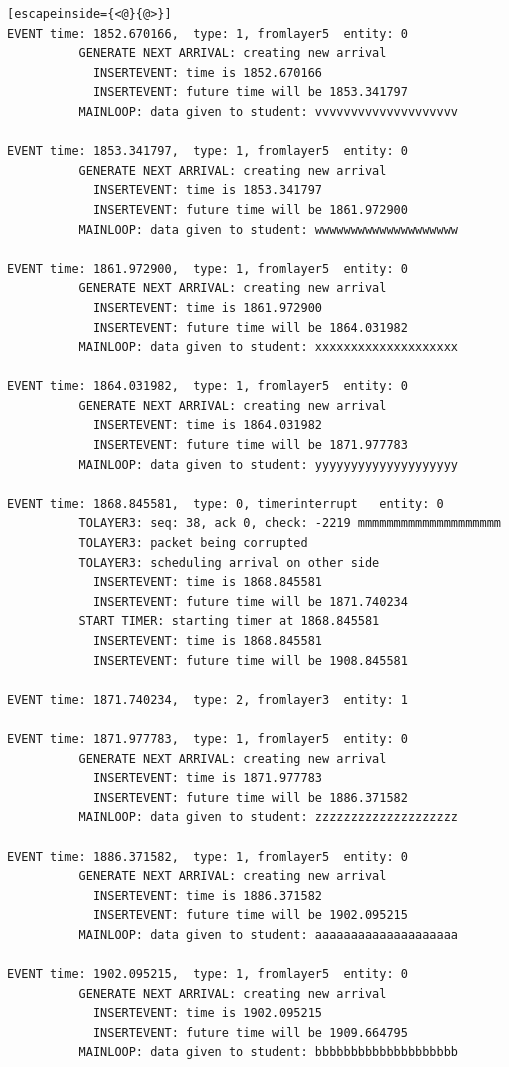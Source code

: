 \documentclass[paper=a4, fontsize=11pt]{scrartcl}
\numberwithin{equation}{section}		%
\numberwithin{figure}{section}			%
\numberwithin{table}{section}				%
\begin{document}
\begin{lstlisting}[escapeinside={<@}{@>}]
EVENT time: 1852.670166,  type: 1, fromlayer5  entity: 0
          GENERATE NEXT ARRIVAL: creating new arrival
            INSERTEVENT: time is 1852.670166
            INSERTEVENT: future time will be 1853.341797
          MAINLOOP: data given to student: vvvvvvvvvvvvvvvvvvvv

EVENT time: 1853.341797,  type: 1, fromlayer5  entity: 0
          GENERATE NEXT ARRIVAL: creating new arrival
            INSERTEVENT: time is 1853.341797
            INSERTEVENT: future time will be 1861.972900
          MAINLOOP: data given to student: wwwwwwwwwwwwwwwwwwww

EVENT time: 1861.972900,  type: 1, fromlayer5  entity: 0
          GENERATE NEXT ARRIVAL: creating new arrival
            INSERTEVENT: time is 1861.972900
            INSERTEVENT: future time will be 1864.031982
          MAINLOOP: data given to student: xxxxxxxxxxxxxxxxxxxx

EVENT time: 1864.031982,  type: 1, fromlayer5  entity: 0
          GENERATE NEXT ARRIVAL: creating new arrival
            INSERTEVENT: time is 1864.031982
            INSERTEVENT: future time will be 1871.977783
          MAINLOOP: data given to student: yyyyyyyyyyyyyyyyyyyy

EVENT time: 1868.845581,  type: 0, timerinterrupt   entity: 0
          TOLAYER3: seq: 38, ack 0, check: -2219 mmmmmmmmmmmmmmmmmmmm
          TOLAYER3: packet being corrupted
          TOLAYER3: scheduling arrival on other side
            INSERTEVENT: time is 1868.845581
            INSERTEVENT: future time will be 1871.740234
          START TIMER: starting timer at 1868.845581
            INSERTEVENT: time is 1868.845581
            INSERTEVENT: future time will be 1908.845581

EVENT time: 1871.740234,  type: 2, fromlayer3  entity: 1

EVENT time: 1871.977783,  type: 1, fromlayer5  entity: 0
          GENERATE NEXT ARRIVAL: creating new arrival
            INSERTEVENT: time is 1871.977783
            INSERTEVENT: future time will be 1886.371582
          MAINLOOP: data given to student: zzzzzzzzzzzzzzzzzzzz

EVENT time: 1886.371582,  type: 1, fromlayer5  entity: 0
          GENERATE NEXT ARRIVAL: creating new arrival
            INSERTEVENT: time is 1886.371582
            INSERTEVENT: future time will be 1902.095215
          MAINLOOP: data given to student: aaaaaaaaaaaaaaaaaaaa

EVENT time: 1902.095215,  type: 1, fromlayer5  entity: 0
          GENERATE NEXT ARRIVAL: creating new arrival
            INSERTEVENT: time is 1902.095215
            INSERTEVENT: future time will be 1909.664795
          MAINLOOP: data given to student: bbbbbbbbbbbbbbbbbbbb


\end{lstlisting}
\end{document}
